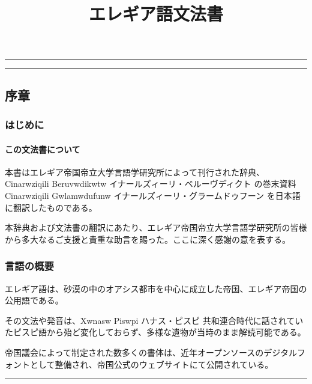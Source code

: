 \documentclass[
  japanese,
]{article}
\title{エレギア語文法書}
\author{}
\date{}
\begin{document}
\maketitle

{
\setcounter{tocdepth}{3}
\tableofcontents
}
\begin{center}\rule{0.5\linewidth}{0.5pt}\end{center}

\begin{center}\rule{0.5\linewidth}{0.5pt}\end{center}

\subsection{序章}\label{chapter1}

\subsubsection{はじめに}\label{section1.1}

\paragraph{この文法書について}\label{subsection1.1.1}

本書はエレギア帝国帝立大学言語学研究所によって刊行された辞典、{Cinarwziqili
Beruvwdikwtw} イナールズィーリ・ベルーヴディクト の巻末資料{Cinarwziqili
Gwlamwdufunw} イナールズィーリ・グラームドゥフーン
を日本語に翻訳したものである。

本辞典および文法書の翻訳にあたり、エレギア帝国帝立大学言語学研究所の皆様から多大なるご支援と貴重な助言を賜った。ここに深く感謝の意を表する。

\subsubsection{言語の概要}\label{section1.2}

エレギア語は、砂漠の中のオアシス都市を中心に成立した帝国、エレギア帝国の公用語である。

その文法や発音は、{Xwnasw Piswpi} ハナス・ピスピ
共和連合時代に話されていたピスピ語から殆ど変化しておらず、多様な遺物が当時のまま解読可能である。

帝国議会によって制定された数多くの書体は、近年オープンソースのデジタルフォントとして整備され、帝国公式のウェブサイトにて公開されている。

\begin{center}\rule{0.5\linewidth}{0.5pt}\end{center}
\end{document}
